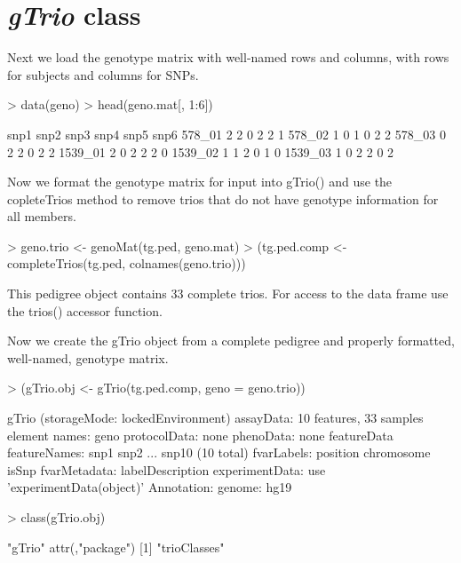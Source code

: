 \documentclass[10pt]{article}
\begin{document}
\section{\emph{gTrio} class}
Next we load the genotype matrix with well-named rows and columns, with rows for subjects and columns for SNPs.
\begin{Schunk}
\begin{Sinput}
> data(geno)
> head(geno.mat[, 1:6])
\end{Sinput}
\begin{Soutput}
        snp1 snp2 snp3 snp4 snp5 snp6
578_01     2    2    0    2    2    1
578_02     1    0    1    0    2    2
578_03     0    2    2    0    2    2
1539_01    2    0    2    2    2    0
1539_02    1    1    2    0    1    0
1539_03    1    0    2    2    0    2
\end{Soutput}
\end{Schunk}
Now we format the genotype matrix for input into gTrio() and use the copleteTrios method to remove trios that do not have genotype information for all members.
\begin{Schunk}
\begin{Sinput}
> geno.trio <- genoMat(tg.ped, geno.mat)
> (tg.ped.comp <- completeTrios(tg.ped, colnames(geno.trio)))
\end{Sinput}
\begin{Soutput}
This pedigree object contains 33 complete trios.
For access to the data frame use the trios() accessor function.
\end{Soutput}
\end{Schunk}
Now we create the gTrio object from a complete pedigree and properly formatted, well-named, genotype matrix.
\begin{Schunk}
\begin{Sinput}
> (gTrio.obj <- gTrio(tg.ped.comp, geno = geno.trio))
\end{Sinput}
\begin{Soutput}
gTrio (storageMode: lockedEnvironment)
assayData: 10 features, 33 samples 
  element names: geno 
protocolData: none
phenoData: none
featureData
  featureNames: snp1 snp2 ... snp10 (10 total)
  fvarLabels: position chromosome isSnp
  fvarMetadata: labelDescription
experimentData: use 'experimentData(object)'
Annotation:  
genome:  hg19 
\end{Soutput}
\begin{Sinput}
> class(gTrio.obj)
\end{Sinput}
\begin{Soutput}
[1] "gTrio"
attr(,"package")
[1] "trioClasses"
\end{Soutput}
\end{Schunk}
\end{document}
